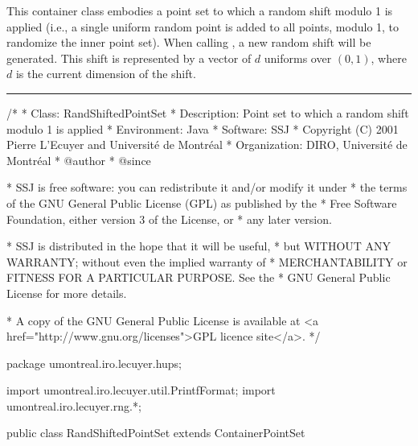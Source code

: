 
%
This container class embodies a point set to which a random shift
modulo 1 is applied (i.e., a single uniform random point is added
to all points, modulo 1, to randomize the inner point set).
When calling , a new random shift will be generated.
This shift is represented by a vector of $d$ uniforms over $(0,1)$,
where $d$ is the current dimension of the shift.



\bigskip\hrule\bigskip

\begin{code}
\begin{hide}
/*
 * Class:        RandShiftedPointSet
 * Description:  Point set to which a random shift modulo 1 is applied
 * Environment:  Java
 * Software:     SSJ 
 * Copyright (C) 2001  Pierre L'Ecuyer and Université de Montréal
 * Organization: DIRO, Université de Montréal
 * @author       
 * @since

 * SSJ is free software: you can redistribute it and/or modify it under
 * the terms of the GNU General Public License (GPL) as published by the
 * Free Software Foundation, either version 3 of the License, or
 * any later version.

 * SSJ is distributed in the hope that it will be useful,
 * but WITHOUT ANY WARRANTY; without even the implied warranty of
 * MERCHANTABILITY or FITNESS FOR A PARTICULAR PURPOSE.  See the
 * GNU General Public License for more details.

 * A copy of the GNU General Public License is available at
   <a href="http://www.gnu.org/licenses">GPL licence site</a>.
 */
\end{hide}
package umontreal.iro.lecuyer.hups;\begin{hide}

import umontreal.iro.lecuyer.util.PrintfFormat;
import umontreal.iro.lecuyer.rng.*;
\end{hide}

public class RandShiftedPointSet extends ContainerPointSet \begin{hide} {

   protected double[] shift;           // The random shift.
   protected int dimShift = 0;         // Current dimension of the shift.
   protected int capacityShift = 0;    // Number of array elements;
                                       // always >= dimShift.
   protected RandomStream shiftStream; // Used to generate random shifts.
\end{hide}
\end{code}

